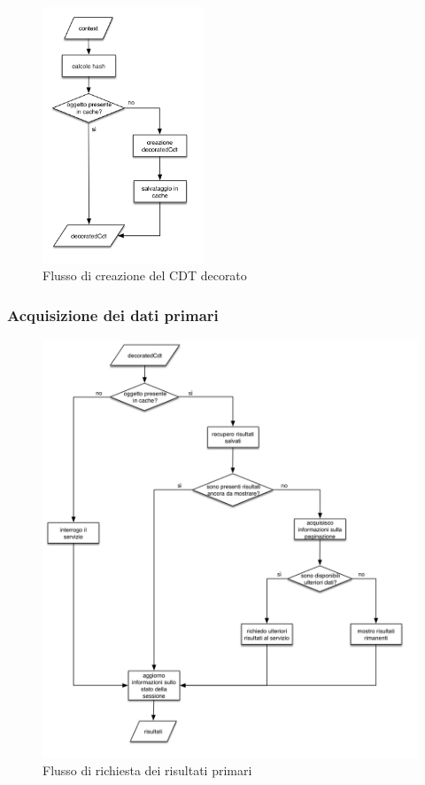 \begin{figure}[ht]
	\centering
	\includegraphics[width=0.43\textwidth]{4-progettazione-alto-livello/Immagini/diagramma_flusso_decoratedCdt.png}
	\caption{Flusso di creazione del CDT decorato\label{fig:flusso-decorated-cdt}}
\end{figure}

\subsubsection*{Acquisizione dei dati primari}

\begin{figure}[!t]
	\centering
	\includegraphics[width=\textwidth]{4-progettazione-alto-livello/Immagini/diagramma_flusso_servizi_primari.png}
	\caption{Flusso di richiesta dei risultati primari\label{fig:flusso-servizi-primari}}
\end{figure}

